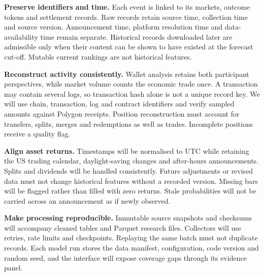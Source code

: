 \textbf{Preserve identifiers and time.} Each event is linked to its markets, outcome tokens and settlement records. Raw records retain source time, collection time and source version. Announcement time, platform resolution time and data-availability time remain separate. Historical records downloaded later are admissible only when their content can be shown to have existed at the forecast cut-off. Mutable current rankings are not historical features.

\textbf{Reconstruct activity consistently.} Wallet analysis retains both participant perspectives, while market volume counts the economic trade once. A transaction may contain several logs, so transaction hash alone is not a unique record key. We will use chain, transaction, log and contract identifiers and verify sampled amounts against Polygon receipts. Position reconstruction must account for transfers, splits, merges and redemptions as well as trades. Incomplete positions receive a quality flag.

\textbf{Align asset returns.} Timestamps will be normalised to UTC while retaining the US trading calendar, daylight-saving changes and after-hours announcements. Splits and dividends will be handled consistently. Future adjustments or revised data must not change historical features without a recorded version. Missing bars will be flagged rather than filled with zero returns. Stale probabilities will not be carried across an announcement as if newly observed.

\textbf{Make processing reproducible.} Immutable source snapshots and checksums will accompany cleaned tables and Parquet research files. Collectors will use retries, rate limits and checkpoints. Replaying the same batch must not duplicate records. Each model run stores the data manifest, configuration, code version and random seed, and the interface will expose coverage gaps through its evidence panel.
